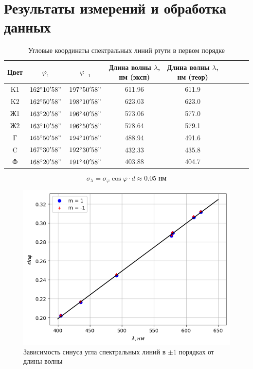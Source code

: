 \section*{Результаты измерений и обработка данных}

\begin{table}[h!]
    \centering
    \begin{tabular}{|c|c|c|c|c|c|c|c|c|}
        \hline
        Цвет & $\varphi_{1}$ & $\varphi_{-1}$ & Длина волны $\lambda$, нм (эксп) & Длина волны $\lambda$, нм (теор) \\\hline
        K1   & $162^{\circ}10'58"$ & $197^{\circ}50'58"$ & 611.96 & 611.9 \\\hline
        K2   & $162^{\circ}50'58"$ & $198^{\circ}10'58"$ & 623.03 & 623.0 \\\hline
        Ж1   & $163^{\circ}20'58"$ & $196^{\circ}40'58"$ & 573.06 & 577.0 \\\hline
        Ж2   & $163^{\circ}10'58"$ & $196^{\circ}50'58"$ & 578.64 & 579.1 \\\hline
        Г    & $165^{\circ}50'58"$ & $194^{\circ}10'58"$ & 488.94 & 491.6 \\\hline
        C    & $167^{\circ}30'58"$ & $192^{\circ}30'58"$ & 432.33 & 435.8 \\\hline
        Ф    & $168^{\circ}20'58"$ & $191^{\circ}40'58"$ & 403.88 & 404.7 \\\hline
    \end{tabular}
    \caption{Угловые координаты спектральных линий ртути в первом порядке}
\end{table}

$$\sigma_{\lambda} = \sigma_{\varphi} \cos\varphi \cdot d \approx 0.05 \text{ нм}$$

\newpage
\begin{figure}[h!]
    \centering
    \includegraphics[width=12cm]{images/plot1.png}
    \caption{Зависимость синуса угла спектральных линий в $\pm 1$ порядках от длины волны} \label{fig:plt1}
\end{figure}


